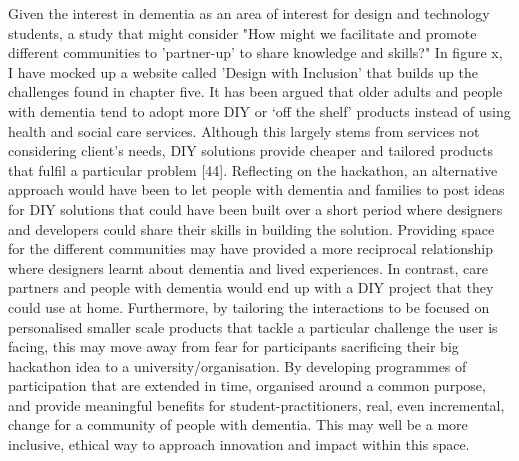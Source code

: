 Given the interest in dementia as an area of interest for design and technology students, a study that might consider "How might we facilitate and promote different communities to 'partner-up' to share knowledge and skills?" In figure x, I have mocked up a website called 'Design with Inclusion' that builds up the challenges found in chapter five. It has been argued that older adults and people with dementia tend to adopt more DIY or ‘off the shelf’ products instead of using health and social care services. Although this largely stems from services not considering client’s needs, DIY solutions provide cheaper and tailored products that fulfil a particular problem [44]. Reflecting on the hackathon, an alternative approach would have been to let people with dementia and families to post ideas for DIY solutions that could have been built over a short period where designers and developers could share their skills in building the solution. Providing space for the different communities may have provided a more reciprocal relationship where designers learnt about dementia and lived experiences. In contrast, care partners and people with dementia would end up with a DIY project that they could use at home. Furthermore, by tailoring the interactions to be focused on personalised smaller scale products that tackle a particular challenge the user is facing, this may move away from fear for participants sacrificing their big hackathon idea to a university/organisation. By developing programmes of participation that are extended in time, organised around a common purpose, and provide meaningful benefits for student-practitioners, real, even incremental, change for a community of people with dementia. This may well be a more inclusive, ethical way to approach innovation and impact within this space.

